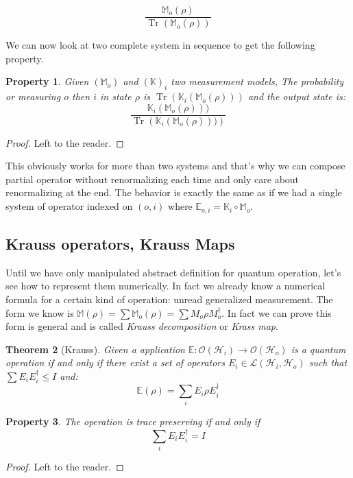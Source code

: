 \documentclass[10pt,a4paper]{report}
\theoremstyle{plain}
\newtheorem{thm}{Theorem}[chapter]
\newtheorem{prop}[thm]{Property}
\theoremstyle{definition}
\theoremstyle{remark}
\newcommand{\TODO}{\textbf{TODO}}
\DeclareMathOperator{\Tr}{Tr}
\newcommand{\trnorm}[1]{\frac{#1}{\Tr\left({#1}\right)}}
\begin{document}
\[\trnorm{\mathbb M_o(\rho)}\]

We can now look at two complete system in sequence to get the following
property.

\begin{prop}\label{prop:qocomp}
  Given $(\mathbb M_o)$ and $(\mathbb K)_i$ two measurement models, The
  probability or measuring $o$ then $i$ in state $\rho$
  is $\Tr(\mathbb K_i (\mathbb M_o(\rho)))$ and the output state is:
  \[\trnorm{\mathbb K_i (\mathbb M_o(\rho)))}\]
\end{prop}

\begin{proof}
  Left to the reader.
\end{proof}

This obviously works for more than two systems and that's why we can compose
partial operator without renormalizing each time and only care about
renormalizing at the end. The behavior is exactly the same as if we had a single
system of operator indexed on $(o,i)$ where $\mathbb E_{o,i} = \mathbb K_i \circ
\mathbb M_o$.

\subsection{Krauss operators, Krauss Maps}\label{ssec:kraus}

Until we have only manipulated abstract definition for quantum operation, let's
see how to represent them numerically. In fact we already know a numerical
formula for a certain kind of operation: unread generalized measurement. The
form we know is $\mathbb{M}(\rho) = \sum \mathbb M_o(\rho) = \sum M_o\rho
M_o^\dagger$. In fact we can prove this form is general and is called
\emph{Krauss decomposition} or \emph{Krass map}.

\begin{thm}[Krauss]
  Given a application $\mathbb E : \mathcal{O}(\mathcal{H}_i) \to
  \mathcal{O}(\mathcal{H}_o)$ is a quantum operation if and only if there exist
  a set of operators $E_i \in \mathcal{L}(\mathcal{H}_i, \mathcal{H}_o)$ such
  that $\sum E_i E_i^\dagger \le I$ and:
  \[\mathbb E(\rho) = \sum_i E_i\rho E_i^\dagger\]
\end{thm}

\begin{prop}
  The operation is trace preserving if and only if
\[\sum_i E_i E_i^\dagger = I\]
\end{prop}

\begin{proof}
  Left to the reader.
\end{proof}
\end{document}
